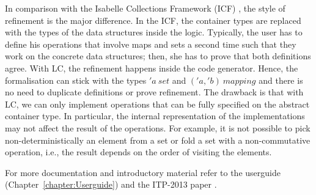 \documentclass[11pt,a4paper]{book}
\begin{document}
In comparison with the Isabelle Collections Framework (ICF) \cite{LammichLochbihler2010ITP,Lammich2009AFP}, the style of refinement is the major difference.
In the ICF, the container types are replaced with the types of the data structures inside the logic.
Typically, the user has to define his operations that involve maps and sets a second time such that they work on the concrete data structures; then, she has to prove that both definitions agree.
With LC, the refinement happens inside the code generator.
Hence, the formalisation can stick with the types $'a\ set$ and $('a, 'b)\ mapping$ and there is no need to duplicate definitions or prove refinement.
The drawback is that with LC, we can only implement operations that can be fully specified on the abstract container type.
In particular, the internal representation of the implementations may not affect the result of the operations.
For example, it is not possible to pick non-deterministically an element from a set or fold a set with a non-commutative operation, i.e., the result depends on the order of visiting the elements.

For more documentation and introductory material refer to the userguide (Chapter~\ref{chapter:Userguide}) and the ITP-2013 paper \cite{Lochbihler2013ITP}.



%



\end{document}
